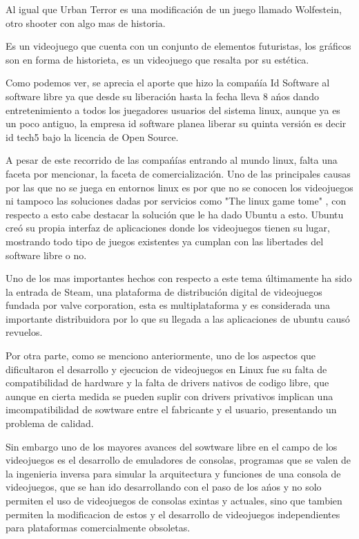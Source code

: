 \begin{multicols}{2}
Al igual que Urban Terror es una modificación de un juego llamado Wolfestein,
otro shooter con algo mas de historia.

Es un videojuego que cuenta con un conjunto de elementos futuristas, los gráficos son en forma de historieta, 
es un videojuego que resalta por su estética.

Como podemos ver, se aprecia el aporte que hizo la compańía  Id Software al software libre ya que desde su 
liberación hasta la fecha lleva 8 ańos dando entretenimiento a todos los juegadores usuarios del sistema linux,
aunque ya es un poco antiguo, la empresa id software planea liberar su quinta versión es decir id tech5 bajo
la licencia de Open Source.

A pesar de este recorrido de las compańías entrando al mundo linux, falta una faceta por 
mencionar, la faceta de comercialización. Uno de las principales causas por las que no se juega
en entornos linux es por que no se conocen los videojuegos ni tampoco las soluciones dadas por
servicios como "The linux game tome" , con respecto a esto cabe destacar la solución que le ha dado Ubuntu a esto.
Ubuntu creó su propia interfaz de aplicaciones donde los videojuegos tienen su lugar, mostrando todo 
tipo de juegos existentes ya cumplan con las libertades del software libre o no.


Uno de los mas importantes hechos con respecto a este tema últimamente ha sido la entrada de Steam,
una plataforma de distribución digital de videojuegos fundada por valve corporation, esta es multiplataforma 
y es considerada una importante distribuidora por lo que su llegada a las aplicaciones de ubuntu causó revuelos.


Por otra parte, como se menciono anteriormente, uno de los aspectos que dificultaron el desarrollo y ejecucion de videojuegos en Linux fue su falta de compatibilidad de hardware y la falta de drivers nativos de codigo libre, que aunque en cierta medida se pueden suplir con drivers privativos implican una imcompatibilidad de sowtware entre el fabricante y el usuario, presentando un problema de calidad.

Sin embargo uno de los mayores avances del sowtware libre en el campo de los videojuegos es el desarrollo de emuladores de consolas, programas que se valen de la ingenieria inversa para simular la arquitectura y funciones de una consola de videojuegos, que se han ido desarrollando con el paso de los ańos y no solo permiten el uso de videojuegos de consolas exintas y actuales, sino que tambien permiten la modificacion de estos y el desarrollo de videojuegos independientes para plataformas comercialmente obsoletas. 


\end{multicols}
